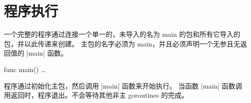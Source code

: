 \section{程序执行}
一个完整的程序通过连接一个单一的，未导入的名为 main 的包和所有它导入的包，并以此传递来创建。
主包的名字必须为 main，并且必须声明一个无参且无返回值的 \code|main| 函数。
\begin{golang}
func main() { … }
\end{golang}
程序通过初始化主包，然后调用 \code|main| 函数来开始执行。
当函数 \code|main| 函数调用返回时，程序退出。不会等待其他非主 goroutines 的完成。
































